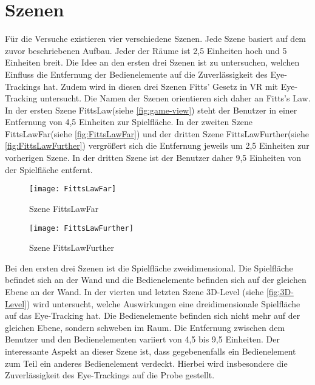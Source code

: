 \section{Szenen}
Für die Versuche existieren vier verschiedene Szenen. Jede Szene basiert auf dem zuvor beschriebenen Aufbau. Jeder der Räume ist 2,5 Einheiten hoch und 5 Einheiten breit. Die Idee an den ersten drei Szenen ist zu untersuchen, welchen Einfluss die Entfernung der Bedienelemente auf die Zuverlässigkeit des Eye-Trackings hat. Zudem wird in diesen drei Szenen Fitts' Gesetz in \ac{VR} mit Eye-Tracking untersucht. Die Namen der Szenen orientieren sich daher an Fitts's Law. In der ersten Szene \glqq FittsLaw\grqq (siehe \autoref{fig:game-view}) steht der Benutzer in einer Entfernung von 4,5 Einheiten zur Spielfläche. In der zweiten Szene \glqq FittsLawFar\grqq (siehe \autoref{fig:FittsLawFar}) und der dritten Szene \glqq FittsLawFurther\grqq (siehe \autoref{fig:FittsLawFurther}) vergrößert sich die Entfernung jeweils um 2,5 Einheiten zur vorherigen Szene. In der dritten Szene ist der Benutzer daher 9,5 Einheiten von der Spielfläche entfernt. 

\begin{figure}[!htbp]
	\centering
	\texttt{[image: FittsLawFar]}
	\caption[Szene FittsLawFar]{Szene FittsLawFar}
	\label{fig:FittsLawFar}
\end{figure}

\begin{figure}[!htbp]
	\centering
	\texttt{[image: FittsLawFurther]}
	\caption[Szene FittsLawFurther]{Szene FittsLawFurther}
	\label{fig:FittsLawFurther}
\end{figure}

Bei den ersten drei Szenen ist die Spielfläche zweidimensional. Die Spielfläche befindet sich an der Wand und die Bedienelemente befinden sich auf der gleichen Ebene an der Wand. In der vierten und letzten Szene \glqq 3D-Level\grqq{} (siehe \autoref{fig:3D-Level})  wird untersucht, welche Auswirkungen eine dreidimensionale Spielfläche auf das Eye-Tracking hat. Die Bedienelemente befinden sich nicht mehr auf der gleichen Ebene, sondern schweben im Raum. Die Entfernung zwischen dem Benutzer und den Bedienelementen variiert von 4,5 bis 9,5 Einheiten. Der interessante Aspekt an dieser Szene ist, dass gegebenenfalls ein Bedienelement zum Teil ein anderes Bedienelement verdeckt. Hierbei wird insbesondere die Zuverlässigkeit des Eye-Trackings auf die Probe gestellt. 

